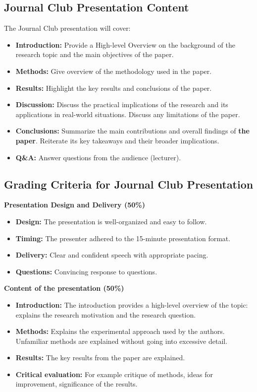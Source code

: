 \documentclass{article}
\begin{document}
\subsection{Journal Club Presentation Content}
The Journal Club presentation will cover:
{ %

\begin{itemize}
    \item \textbf{Introduction:} Provide a High-level Overview on the background of the research topic and the main objectives of the paper.
    \item \textbf{Methods:} Give overview of the methodology used in the paper.
    \item \textbf{Results:} Highlight the key results and conclusions of the paper.
    \item \textbf{Discussion:} Discuss the practical implications of the research and its applications in real-world situations. Discuss any limitations of the paper.
    \item \textbf{Conclusions:} Summarize the main contributions and overall findings of \textbf{the paper}. Reiterate its key takeaways and their broader implications.
    \item \textbf{Q\&A:} Answer questions from the audience (lecturer).
\end{itemize}
}

\subsection{Grading Criteria for Journal Club Presentation}
\textbf{Presentation Design and Delivery (50\%)}
{ %
\begin{itemize}
    \item \textbf{Design:} The presentation is well-organized and easy to follow.
    \item \textbf{Timing:} The presenter adhered to the 15-minute presentation format.
    \item \textbf{Delivery:} Clear and confident speech with appropriate pacing.
    \item \textbf{Questions:} Convincing response to questions.
\end{itemize}
}

\textbf{Content of the presentation (50\%)}
{ %
\begin{itemize}
    \item \textbf{Introduction:} The introduction provides a high-level overview of the topic: explains the research motivation and the research question.
    \item \textbf{Methods:} Explains the experimental approach used by the authors. Unfamiliar methods are explained without going into excessive detail.
    \item \textbf{Results:} The key results from the paper are explained.
    \item \textbf{Critical evaluation:} For example critique of methods, ideas for improvement, significance of the results.
\end{itemize}
}
\end{document}
